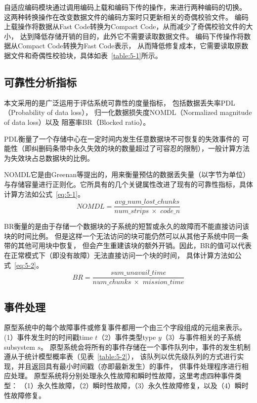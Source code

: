 自适应编码模块通过调用编码上载和编码下传的操作，来进行两种编码的切换。 
这两种转换操作在改变数据文件的编码方案时只更新相关的奇偶校验文件。 
编码上载操作将数据从Fast Code转换为Compact Code，从而减少了奇偶校验文件的大小，
达到降低存储开销的目的，此外它不需要读取数据文件。 编码下传操作将数据从Compact Code转换为Fast Code表示，
从而降低修复成本，它需要读取原数据文件和奇偶性校验块，具体如表~\ref{table:5-1}所示。 



\subsection{可靠性分析指标}
本文采用的是广泛运用于评估系统可靠性的度量指标，
包括数据丢失率PDL（Probability of data loss），
归一化数据损失度NOMDL（Normalized magnitude of data loss）以及
阻塞率BR（Blocked ratio）。

PDL衡量了一个存储中心在一定时间内发生任意数据块不可恢复的失效事件的
可能性（即纠删码条带中永久失效的块的数量超过了可容忍的限制），一般计算方法为失效块占总数据块的比例。

NOMDL它是由Greenan\cite{greenan2009reliability}等提出的，用来衡量预估的数据丢失量（以字节为单位）
与存储容量进行正则化。它所具有的几个关键属性改进了现有的可靠性指标，具体计算方法如公式~\ref{eq:5-1}。
\begin{equation}
	\label{eq:5-1}
	NOMDL=\frac{avg\_num\_lost\_chunks}{num\_strips\ \times \,\,code\_n}
\end{equation}


BR衡量的是由于存储一个数据块的子系统的短暂或永久的故障而不能直接访问该块的时间比例。
但是这样一个无法访问的块可能仍然可以从其他子系统中同一条带的其他可用块中恢复，
但会产生重建该块的额外开销。因此，BR的值可以代表在正常模式下（即没有故障）无法直接访问一个块的时间，
具体计算方法如公式~\ref{eq:5-2}。
\begin{equation}
	\label{eq:5-2}
	BR=\frac{sum\_unavail\_time}{num\_chunks\ \times \,\,mission\_time}
\end{equation}

\subsection{事件处理}
原型系统中的每个故障事件或修复事件都用一个由三个字段组成的元组来表示。 
(1）事件发生时的时间戳time $t$（2）事件类型type $y$（3）与事件相关的子系统subsystem $s$。
原型系统会将所有的事件存储在一个事件队列中，事件的发生机制遵从于统计模型概率表（见表~\ref{table:5-2}），
该队列以优先级队列的方式进行实现，并且返回具有最小时间戳（亦即最新发生）的事件，
供事件处理程序进行相应处理。 原型系统将分别处理永久性故障和瞬时性故障，这里考虑四种事件类型：
（1）永久性故障，（2）瞬时性故障，（3）永久性故障修复，以及（4）瞬时性故障修复。 

